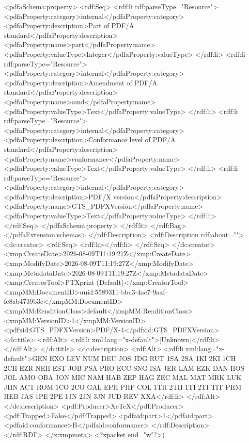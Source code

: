{              <pdfaSchema:property>
                <rdf:Seq>
                  <rdf:li rdf:parseType="Resource">
                    <pdfaProperty:category>internal</pdfaProperty:category>
                    <pdfaProperty:description>Part of PDF/A standard</pdfaProperty:description>
                    <pdfaProperty:name>part</pdfaProperty:name>
                    <pdfaProperty:valueType>Integer</pdfaProperty:valueType>
                  </rdf:li>
                  <rdf:li rdf:parseType="Resource">
                    <pdfaProperty:category>internal</pdfaProperty:category>
                    <pdfaProperty:description>Amendment of PDF/A standard</pdfaProperty:description>
                    <pdfaProperty:name>amd</pdfaProperty:name>
                    <pdfaProperty:valueType>Text</pdfaProperty:valueType>
                  </rdf:li>
                  <rdf:li rdf:parseType="Resource">
                    <pdfaProperty:category>internal</pdfaProperty:category>
                    <pdfaProperty:description>Conformance level of PDF/A standard</pdfaProperty:description>
                    <pdfaProperty:name>conformance</pdfaProperty:name>
                    <pdfaProperty:valueType>Text</pdfaProperty:valueType>
                  </rdf:li>
                  <rdf:li rdf:parseType="Resource">
                    <pdfaProperty:category>internal</pdfaProperty:category>
                    <pdfaProperty:description>PDF/X version</pdfaProperty:description>
                    <pdfaProperty:name>GTS_PDFXVersion</pdfaProperty:name>
                    <pdfaProperty:valueType>Text</pdfaProperty:valueType>
                  </rdf:li>
                </rdf:Seq>
              </pdfaSchema:property>
            </rdf:li>
          </rdf:Bag>
        </pdfaExtension:schemas>
      </rdf:Description>
      <rdf:Description rdf:about="">
        <dc:creator>
          <rdf:Seq>
            <rdf:li></rdf:li>
          </rdf:Seq>
        </dc:creator>
        <xmp:CreateDate>2026-08-09T11:19:27Z</xmp:CreateDate>
        <xmp:ModifyDate>2026-08-09T11:19:27Z</xmp:ModifyDate>
        <xmp:MetadataDate>2026-08-09T11:19:27Z</xmp:MetadataDate>
        <xmp:CreatorTool>PTXprint (Default)</xmp:CreatorTool>
        <xmpMM:DocumentID>uuid:5589311-bbc3-4ac7-9aaf-fc8ab4739b3c</xmpMM:DocumentID>
        <xmpMM:RenditionClass>default</xmpMM:RenditionClass>
        <xmpMM:VersionID>1</xmpMM:VersionID>
        <pdfxid:GTS_PDFXVersion>PDF/X-4</pdfxid:GTS_PDFXVersion>
        <dc:title>
          <rdf:Alt>
            <rdf:li xml:lang="x-default">[Unknown]</rdf:li>
          </rdf:Alt>
        </dc:title>
        <dc:description>
          <rdf:Alt>
            <rdf:li xml:lang="x-default">GEN EXO LEV NUM DEU JOS JDG RUT 1SA 2SA 1KI 2KI 1CH 2CH EZR NEH EST JOB PSA PRO ECC SNG ISA JER LAM EZK DAN HOS JOL AMO OBA JON MIC NAM HAB ZEP HAG ZEC MAL MAT MRK LUK JHN ACT ROM 1CO 2CO GAL EPH PHP COL 1TH 2TH 1TI 2TI TIT PHM HEB JAS 1PE 2PE 1JN 2JN 3JN JUD REV XXA</rdf:li>
          </rdf:Alt>
        </dc:description>
        <pdf:Producer>XeTeX</pdf:Producer>
        <pdf:Trapped>False</pdf:Trapped>
      <pdfaid:part>1</pdfaid:part>
      <pdfaid:conformance>B</pdfaid:conformance>
      </rdf:Description>
  </rdf:RDF>
</x:xmpmeta>
<?xpacket end="w"?>)}
